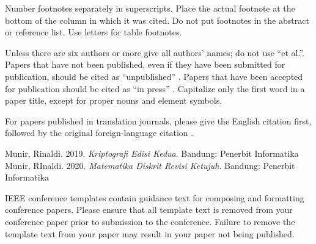 \documentclass[10pt,conference]{IEEEtran}
\begin{document}
Number footnotes separately in superscripts. Place the actual footnote at 
the bottom of the column in which it was cited. Do not put footnotes in the 
abstract or reference list. Use letters for table footnotes.

Unless there are six authors or more give all authors' names; do not use 
``et al.''. Papers that have not been published, even if they have been 
submitted for publication, should be cited as ``unpublished'' \cite{b4}. Papers 
that have been accepted for publication should be cited as ``in press'' \cite{b5}. 
Capitalize only the first word in a paper title, except for proper nouns and 
element symbols.

For papers published in translation journals, please give the English 
citation first, followed by the original foreign-language citation \cite{b6}.

\begin{thebibliography}{00}
 Munir, Rinaldi. 2019. \emph{Kriptografi Edisi Kedua}. Bandung: Penerbit Informatika 
 Munir, RInaldi. 2020. \emph{Matematika Diskrit Revisi Ketujuh}. Bandung: Penerbit Informatika

\end{thebibliography}
\vspace{12pt}
\color{red}
IEEE conference templates contain guidance text for composing and formatting conference papers. Please ensure that all template text is removed from your conference paper prior to submission to the conference. Failure to remove the template text from your paper may result in your paper not being published.
\end{document}
